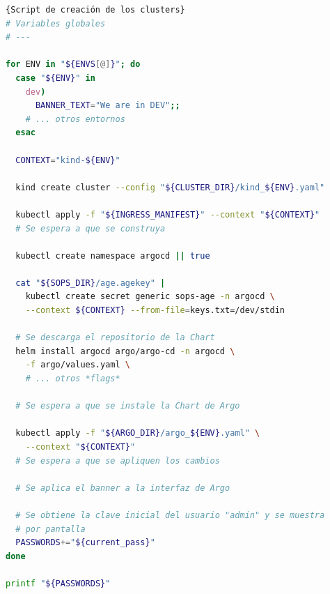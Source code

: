 \begin{lstlisting}[language=bash,label=lst:create-clusters]{Script de creación de los clusters}
# Variables globales
# ---

for ENV in "${ENVS[@]}"; do
  case "${ENV}" in
    dev)
      BANNER_TEXT="We are in DEV";;
    # ... otros entornos
  esac

  CONTEXT="kind-${ENV}"

  kind create cluster --config "${CLUSTER_DIR}/kind_${ENV}.yaml"

  kubectl apply -f "${INGRESS_MANIFEST}" --context "${CONTEXT}"
  # Se espera a que se construya

  kubectl create namespace argocd || true

  cat "${SOPS_DIR}/age.agekey" |
    kubectl create secret generic sops-age -n argocd \
    --context ${CONTEXT} --from-file=keys.txt=/dev/stdin

  # Se descarga el repositorio de la Chart
  helm install argocd argo/argo-cd -n argocd \
    -f argo/values.yaml \
    # ... otros *flags*

  # Se espera a que se instale la Chart de Argo

  kubectl apply -f "${ARGO_DIR}/argo_${ENV}.yaml" \
    --context "${CONTEXT}"
  # Se espera a que se apliquen los cambios

  # Se aplica el banner a la interfaz de Argo

  # Se obtiene la clave inicial del usuario "admin" y se muestra
  # por pantalla
  PASSWORDS+="${current_pass}"
done

printf "${PASSWORDS}"
\end{lstlisting}

